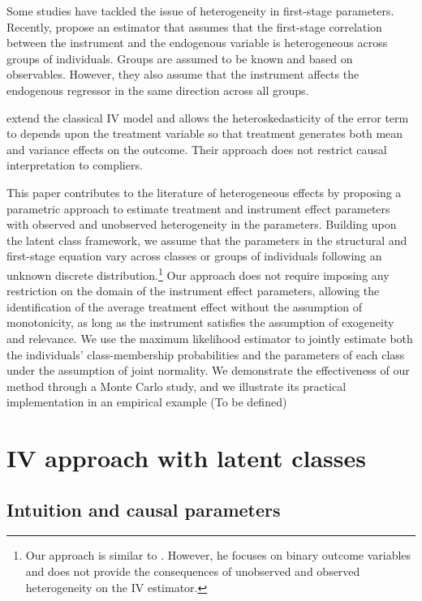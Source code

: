 \documentclass[12pt]{article}
\begin{document}
Some studies have tackled the issue of heterogeneity in first-stage parameters. Recently, \cite{abadie2019instrumental} propose an estimator that assumes that the first-stage correlation between the instrument and the endogenous variable is heterogeneous across groups of individuals. Groups are assumed to be known and based on observables. However, they also assume that the instrument affects the endogenous regressor in the same direction across all groups. 

\cite{abrevaya2021estimation} extend the classical IV model and allows the heteroskedasticity of the error term to depends upon the treatment variable so that treatment generates both mean and variance effects on the outcome. Their approach does not restrict causal interpretation to compliers. 

This paper contributes to the literature of heterogeneous effects by proposing a parametric approach to estimate treatment and instrument effect parameters with observed and unobserved heterogeneity in the parameters. Building upon the latent class framework, we assume that the parameters in the structural and first-stage equation vary across classes or groups of individuals following an unknown discrete distribution.\footnote{Our approach is similar to \cite{sarrias2021two}. However, he focuses on binary outcome variables and does not provide the consequences of unobserved and observed heterogeneity on the IV estimator.} Our approach does not require imposing any restriction on the domain of the instrument effect parameters, allowing the identification of the average treatment effect without the assumption of monotonicity, as long as the instrument satisfies the assumption of exogeneity and relevance. We use the maximum likelihood estimator to jointly estimate both the individuals' class-membership probabilities and the parameters of each class under the assumption of joint normality. We demonstrate the effectiveness of our method through a Monte Carlo study, and we illustrate its practical implementation in an empirical example (To be defined)

\section{IV approach with latent classes}

\subsection{Intuition and causal parameters}
\end{document}
